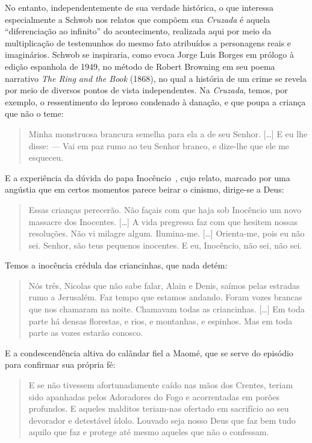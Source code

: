 No entanto, independentemente de sua verdade histórica, o que interessa
especialmente a Schwob nos relatos que compõem sua \textit{Cruzada} é aquela
“diferenciação ao infinito” do acontecimento, realizada aqui por meio da
multiplicação de testemunhos do mesmo fato atribuídos a personagens reais e
imaginários. Schwob se inspiraria, como evoca Jorge Luis Borges em prólogo à
edição espanhola de 1949, no método de Robert Browning em seu poema narrativo
\textit{The Ring and the Book} (1868), no qual a história de um crime se revela
 por meio de diversos pontos de vista independentes. Na \textit{Cruzada},
temos, por exemplo, o ressentimento do leproso condenado à danação, e que poupa
a criança que não o teme: 

\begin{quote}
Minha monstruosa brancura semelha para ela a de seu
Senhor. [\ldots{}] E eu lhe disse: --- Vai em paz rumo ao teu Senhor branco, e
dize-lhe que ele me esqueceu.
\end{quote}

E a experiência da dúvida do papa
Inocêncio~, cujo relato, marcado por uma angústia que em certos momentos
parece beirar o cinismo, dirige-se a Deus: 

\begin{quote}
Essas crianças perecerão. Não
façais com que haja sob Inocêncio um novo massacre dos Inocentes. [\ldots{}] A vida
pregressa faz com que hesitem nossas resoluções. Não vi milagre algum.
Ilumina-me. [\ldots{}] Orienta-me, pois eu não sei. Senhor, são teus pequenos
inocentes. E eu, Inocêncio, não sei, não sei.
\end{quote} 

Temos a inocência
crédula das criancinhas, que nada detém:

\begin{quote}
Nós três, Nicolas que não sabe falar,
Alain e Denis, saímos pelas estradas rumo a Jerusalém. Faz tempo que estamos
andando. Foram vozes brancas que nos chamaram na noite. Chamavam todas as
criancinhas. [\ldots{}] Em toda parte há densas florestas, e rios, e montanhas, e
espinhos. Mas em toda parte as vozes estarão conosco.
\end{quote} 

E a condescendência altiva do calândar fiel a Maomé, que se serve do episódio para
confirmar sua própria fé:

\begin{quote}
E se não tivessem afortunadamente caído nas mãos
dos Crentes, teriam sido apanhadas pelos Adoradores do Fogo e acorrentadas em
porões profundos. E aqueles malditos teriam-nas ofertado em sacrifício ao seu
devorador e detestável ídolo. Louvado seja nosso Deus que faz bem tudo aquilo
que faz e protege até mesmo aqueles que não o confessam.
\end{quote} 

